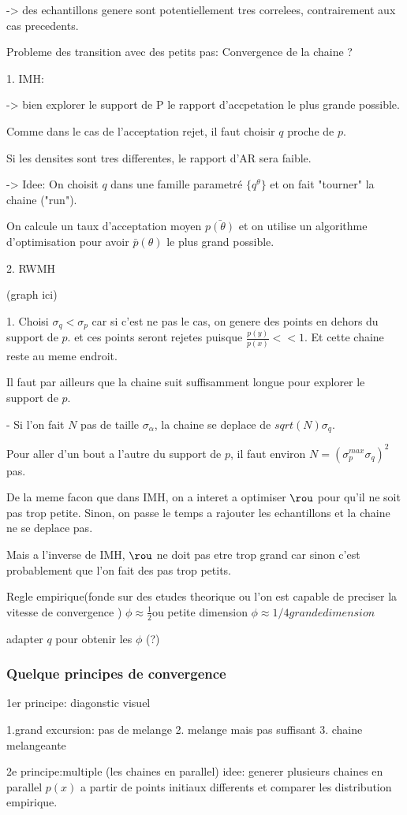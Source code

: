\documentclass{article}
\begin{document}
-> des echantillons genere sont potentiellement tres correlees, contrairement aux cas precedents.

Probleme des transition avec des petits pas:
Convergence de la chaine ?


1. IMH:

-> bien explorer le support de P
le rapport d'accpetation le plus grande possible.

Comme dans le cas de l'acceptation rejet, il faut choisir $q$ proche de $p$.

Si les densites sont tres differentes, le rapport d'AR sera faible.

-> Idee: On choisit $q$ dans une famille parametr\'e $\{q^{\theta}\}$ et on fait "tourner" la chaine ("run").

On calcule un taux d'acceptation moyen $\bar{p(\theta)}$ et on utilise un algorithme d'optimisation pour avoir $\bar{p}(\theta)$ le plus grand possible.

2. RWMH

(graph ici)

1. Choisi $\sigma_q<\sigma_p$
car si c'est ne pas le cas, on genere des points en dehors du support de $p$.
et ces points seront rejetes puisque $\frac{p(y)}{p(x)} << 1$. Et cette chaine reste au meme endroit.

Il faut par ailleurs que la chaine suit suffisamment longue pour explorer le support de $p$.

- Si l'on fait $N$ pas de taille $\sigma_\alpha$, la chaine se deplace de $sqrt(N)\sigma_q$.

Pour aller d'un bout a l'autre du support de $p$, il faut environ $N=(\sigma_p^{max}\sigma_q)^2$ pas.

De la meme facon que dans IMH, on a interet a optimiser $\rou$ pour qu'il ne soit pas trop petite. Sinon, on passe le temps a rajouter les echantillons et la chaine ne se deplace pas.

Mais a l'inverse de IMH, $\rou$ ne doit pas etre trop grand car sinon c'est probablement que l'on fait des pas trop petits.

Regle empirique(fonde sur des etudes theorique ou l'on est capable de preciser la vitesse de convergence )
$\phi \approx \frac{1}{2}$ou  petite dimension
$\phi \approx 1/4 grande dimension$

adapter $q$ pour obtenir les $\phi$ (?)

\subsubsection{Quelque principes de convergence}

1er principe: diagonstic visuel

1.grand excursion: pas de melange
2. melange mais pas suffisant
3. chaine melangeante


2e principe:multiple (les chaines en parallel)
idee: generer plusieurs chaines en parallel $p(x)$ a partir de points initiaux differents et comparer les distribution empirique.
\end{document}
